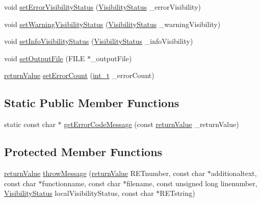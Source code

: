 \begin{DoxyCompactItemize}
void \hyperlink{class_message_handling_a31f12baabf23d05c97e2da9dbd8adf6e}{set\+Error\+Visibility\+Status} (\hyperlink{_types_8hpp_a36503475bb1fea0a7fd7087259ee63c1}{Visibility\+Status} \+\_\+error\+Visibility)
\item 
void \hyperlink{class_message_handling_aaa411b35b599fe59c57b94e0eb0f2728}{set\+Warning\+Visibility\+Status} (\hyperlink{_types_8hpp_a36503475bb1fea0a7fd7087259ee63c1}{Visibility\+Status} \+\_\+warning\+Visibility)
\item 
void \hyperlink{class_message_handling_ac1f2497e237ab552f408db52e7ba6359}{set\+Info\+Visibility\+Status} (\hyperlink{_types_8hpp_a36503475bb1fea0a7fd7087259ee63c1}{Visibility\+Status} \+\_\+info\+Visibility)
\item 
void \hyperlink{class_message_handling_a91cf9df3e66b84d4fb6039b39de32390}{set\+Output\+File} (F\+I\+LE $\ast$\+\_\+output\+File)
\item 
\hyperlink{_message_handling_8hpp_a81d556f613bfbabd0b1f9488c0fa865e}{return\+Value} \hyperlink{class_message_handling_a06e5c330c9684fc187222db061ba5a0e}{set\+Error\+Count} (\hyperlink{_types_8hpp_ab6fd6105e64ed14a0c9281326f05e623}{int\+\_\+t} \+\_\+error\+Count)
\end{DoxyCompactItemize}
\subsection*{Static Public Member Functions}
\begin{DoxyCompactItemize}
\item 
static const char $\ast$ \hyperlink{class_message_handling_aa6107f3844b0d91478daec1301620560}{get\+Error\+Code\+Message} (const \hyperlink{_message_handling_8hpp_a81d556f613bfbabd0b1f9488c0fa865e}{return\+Value} \+\_\+return\+Value)
\end{DoxyCompactItemize}
\subsection*{Protected Member Functions}
\begin{DoxyCompactItemize}
\item 
\hyperlink{_message_handling_8hpp_a81d556f613bfbabd0b1f9488c0fa865e}{return\+Value} \hyperlink{class_message_handling_ab7eff297de539c158ed8583f2146a352}{throw\+Message} (\hyperlink{_message_handling_8hpp_a81d556f613bfbabd0b1f9488c0fa865e}{return\+Value} R\+E\+Tnumber, const char $\ast$additionaltext, const char $\ast$functionname, const char $\ast$filename, const unsigned long linenumber, \hyperlink{_types_8hpp_a36503475bb1fea0a7fd7087259ee63c1}{Visibility\+Status} local\+Visibility\+Status, const char $\ast$R\+E\+Tstring)
\end{DoxyCompactItemize}
